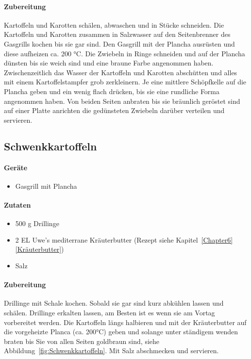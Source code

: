 \paragraph{Zubereitung}

Kartoffeln und Karotten schälen, abwaschen und in Stücke schneiden. Die Kartoffeln und Karotten zusammen in Salzwasser auf den 
Seitenbrenner des Gasgrills kochen bis sie gar sind.  Den Gasgrill mit der Plancha ausrüsten und diese aufheizen ca. 200 °C. Die Zwiebeln in 
Ringe schneiden und auf der Plancha dünsten bis sie weich sind und eine braune Farbe angenommen haben. Zwischenzeitlich das Wasser der 
Kartoffeln und Karotten abschütten und alles mit einem Kartoffelstampfer grob zerkleinern. Je eine mittlere Schöpfkelle auf die Plancha geben 
und ein wenig flach drücken, bis sie eine rundliche Forma angenommen haben. Von beiden Seiten anbraten bis sie bräunlich geröstet sind auf 
einer Platte anrichten die gedünsteten Zwiebeln darüber verteilen und servieren.

\subsection{Schwenkkartoffeln}

\paragraph{Geräte}

\begin{itemize}
	\item Gasgrill mit Plancha
\end{itemize}

\paragraph{Zutaten}

\begin{itemize}[noitemsep]
	\item 500 g Drillinge
	\item 2 EL Uwe's mediterrane Kräuterbutter (Rezept siehe 
	Kapitel~\ref{Chapter6} \vref{Kräuterbutter})
	\item Salz
\end{itemize}

\paragraph{Zubereitung}

Drillinge mit Schale kochen. Sobald sie gar sind kurz abkühlen lassen und schälen. Drillinge erkalten lassen, am Besten ist es wenn sie am 
Vortag vorbereitet werden. Die Kartoffeln längs halbieren und mit der Kräuterbutter auf die vorgeheizte Planca (ca. 200°C) geben und solange 
unter ständigem wenden braten bis Sie von allen Seiten goldbraun sind, siehe Abbildung~\vref{fig:Schwenkkartoffeln}. Mit Salz abschmecken 
und servieren. 
\newpage

